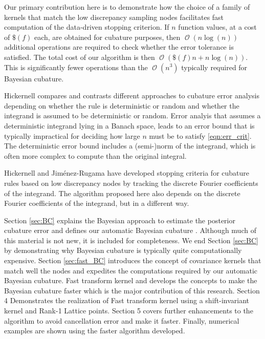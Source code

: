 \documentclass[twocolumn]{svjour3}          %
\DeclareMathOperator{\Order}{{\mathcal O}}
\begin{document}
Our primary contribution here is to demonstrate how the choice of a family of kernels that match the low discrepancy sampling nodes facilitates fast computation of the data-driven stopping criterion.  If $n$ function values, at a cost of $\$(f)$ each, are obtained for cubature purposes, then $\Order(n \log(n))$ additional operations are required to check whether the error tolerance is satisfied.  The total cost of our algorithm is then $\Order(\$(f)n + n \log(n))$.  This is significantly fewer operations than the $\Order(n^3)$ typically required for Bayesian cubature.

Hickernell \cite{Hic17a} compares and contrasts different approaches to cubature error analysis depending on whether the rule is deterministic or random and whether the integrand is assumed to be deterministic or random.  Error analyis that assumes a deterministic integrand lying in a Banach space, leads to an error bound that is typically impractical for deciding how large $n$ must be to satisfy \eqref{eqn:err_crit}.  The deterministic error bound includes a (semi-)norm of the integrand, which is often more complex to compute than the original integral.

Hickernell and Jim\'enez-Rugama\cite{HicJim16a,JimHic16a} have developed stopping criteria for cubature rules based on low discrepancy nodes by tracking the discrete Fourier coefficients of the integrand.  The algorithm proposed here also depends on the discrete Fourier coefficients of the integrand, but in a different way.

Section \ref{sec:BC} explains the Bayesian approach to estimate the posterior cubature error and defines our automatic Bayesian cubature . Although much of this material is not new, it is included for completeness.  We end Section \ref{sec:BC}  by demonstrating why Bayesian cubature is typically quite computationally expensive.
Section \ref{sec:fast_BC}  introduces the concept of covariance kernels that match well the nodes and expedites the computations required by our automatic Bayesian cubature. Fast transform kernel and develops the concepts to make the Bayesian cubature faster which is the major contribution of this research.
Section 4 Demonstrates the realization of Fast transform kernel using a shift-invariant kernel and Rank-1 Lattice points.
Section 5 covers further enhancements to the algorithm to avoid cancellation error and make it faster. Finally, numerical examples are shown using the faster algorithm developed.
\end{document}
